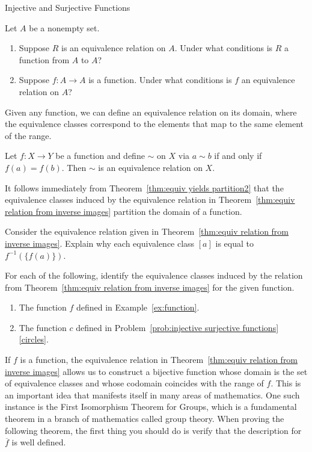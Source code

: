\begin{section}{Injective and Surjective Functions}
\begin{problem}
Let $A$ be a nonempty set.
\begin{enumerate}[label=\textrm{(\alph*)}]
\item Suppose $R$ is an equivalence relation on $A$. Under what conditions is $R$ a function from $A$ to $A$?
\item Suppose $f:A\to A$ is a function. Under what conditions is $f$ an equivalence relation on $A$?
\end{enumerate}
\end{problem}

Given any function, we can define an equivalence relation on its domain, where the equivalence classes correspond to the elements that map to the same element of the range.

\begin{theorem}\label{thm:equiv relation from inverse images}
Let $f:X\to Y$ be a function and define $\sim$ on $X$ via $a\sim b$ if and only if $f(a) = f(b)$. Then $\sim$ is an equivalence relation on $X$.
\end{theorem}

It follows immediately from Theorem~\ref{thm:equiv yields partition2} that the equivalence classes induced by the equivalence relation in Theorem~\ref{thm:equiv relation from inverse images} partition the domain of a function.

\begin{problem}
Consider the equivalence relation given in Theorem~\ref{thm:equiv relation from inverse images}. Explain why each equivalence class $[a]$ is equal to $f^{-1}(\{f(a)\})$.
\end{problem}

\begin{problem}\label{prob:equiv classes from inverse images}
For each of the following, identify the equivalence classes induced by the relation from Theorem~\ref{thm:equiv relation from inverse images} for the given function.
\begin{enumerate}[label=\textrm{(\alph*)}]
\item The function $f$ defined in Example~\ref{ex:function}.
\item The function $c$ defined in Problem~\ref{prob:injective surjective functions}\ref{circles}.
\end{enumerate}
\end{problem}

If $f$ is a function, the equivalence relation in Theorem~\ref{thm:equiv relation from inverse images} allows us to construct a bijective function whose domain is the set of equivalence classes and whose codomain coincides with the range of $f$.  This is an important idea that manifests itself in many areas of mathematics.  One such instance is the First Isomorphism Theorem for Groups, which is a fundamental theorem in a branch of mathematics called group theory.  When proving the following theorem, the first thing you should do is verify that the description for $\overline{f}$ is well defined.


\end{section}
